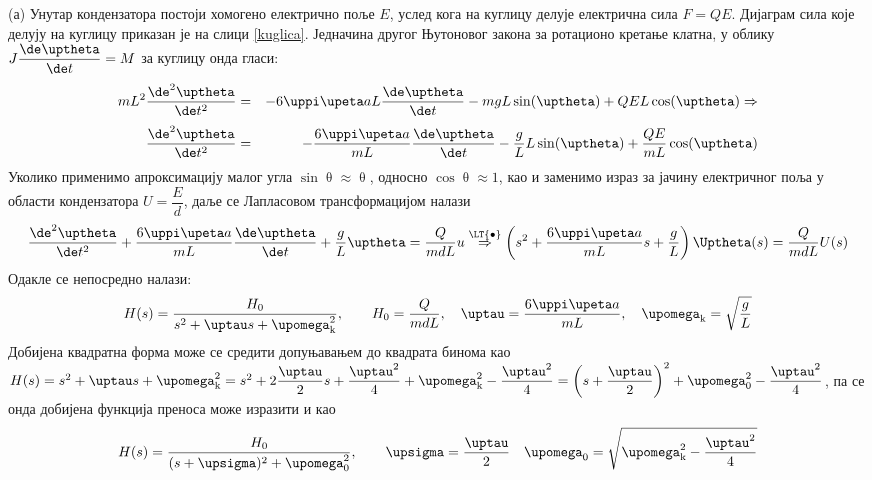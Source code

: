 \RESENJE
(а) Унутар кондензатора постоји хомогено електрично поље $E$, услед кога на куглицу 
делује електрична сила $F = QE$.
Дијаграм сила које делују на куглицу приказан је на слици \ref{kuglica}. 
Једначина другог Њутоновог закона за ротационо кретање клатна, у облику $J \dfrac{\de\uptheta}{\de t} = M$ за
куглицу онда гласи:
\begin{eqnarray} 
    mL^2 \dfrac{\de^2 \uptheta}{\de t^2} &=& - 6\uppi \upeta a L\dfrac{\de \uptheta}{\de t} - mgL\sin(\uptheta) + QE L\cos(\uptheta) \Rightarrow \\[1mm]
    \dfrac{\de^2 \uptheta}{\de t^2} &=& - \dfrac{6\uppi \upeta a}{mL}  \dfrac{\de \uptheta}{\de t} - \dfrac{g}{L} L\sin(\uptheta) + \dfrac{QE}{mL}\cos(\uptheta)
\end{eqnarray}
Уколико применимо апроксимацију малог угла $\sin\uptheta \approx \uptheta$, односно $\cos \uptheta \approx 1$, као и заменимо 
израз за јачину електричног поља у области кондензатора $U = \dfrac{E}{d}$, даље се Лапласовом трансформацијом налази 
\begin{eqnarray}
    \dfrac{\de^2 \uptheta}{\de t^2} + \dfrac{6\uppi \upeta a}{mL}  \dfrac{\de \uptheta}{\de t} + \dfrac{g}{L} \uptheta =  \dfrac{Q}{mdL} u
    \overset{{\LT{\bullet}}}{ \Rightarrow } 
    \left(
        s^2 + \dfrac{6\uppi \upeta a}{mL} s +  \dfrac{g}{L}
    \right) \Uptheta(s) =
    \dfrac{Q}{mdL} U(s)
\end{eqnarray}
Одакле се непосредно налази:
\begin{equation}
    H(s) = \dfrac{ H_0 }{s^2 + \uptau s + \upomega_{\rm k}^2}, \qquad H_0 = \dfrac{Q}{mdL}, \quad \uptau = \dfrac{6\uppi \upeta a}{mL}, \quad \upomega_{\rm k} = \sqrt{\dfrac{g}{L}}
\end{equation}
Добијена квадратна форма може се средити допуњавањем до квадрата бинома као 
$ H(s) = s^2 + \uptau s + \upomega_{\rm k}^2 = s^2 + 2 \dfrac{\uptau}{2} s + \dfrac{\uptau^2}{4} + \upomega_{\rm k}^2 - \dfrac{\uptau^2}{4} 
= \left( s + \dfrac{\uptau}{2} \right)^2 +  \upomega_0^2 - \dfrac{\uptau^2}{4}$, па се онда добијена функција преноса може изразити и као 
\begin{eqnarray}
    H(s) = \dfrac{H_0}{(s + \upsigma)^2 + \upomega_0^2}, \qquad \upsigma = \dfrac{\uptau}{2} \quad \upomega_0 = \sqrt{\upomega_{\rm k}^2 - \dfrac{\uptau^2}{4} }
\end{eqnarray}

